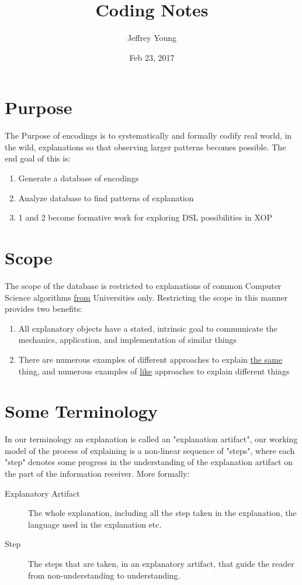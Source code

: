 \documentclass[10pt, letterpaper]{article}
\author{Jeffrey Young}
\date{Feb 23, 2017}
\title{Coding Notes}
\begin{document}
\maketitle

\section*{Purpose}
\label{sec:org4c99545}
The Purpose of encodings is to systematically and formally codify real world, in the wild, explanations so that observing larger patterns becomes possible. The end goal of this is:
\begin{enumerate}
\item Generate a database of encodings
\item Analyze database to find patterns of explanation
\item 1 and 2 become formative work for exploring DSL possibilities in XOP
\end{enumerate}
\section*{Scope}
\label{sec:orgd9f9156}
The scope of the database is restricted to explanations of common Computer Science algorithms \uline{from} Universities only. Restricting the scope in this manner provides two benefits:
\begin{enumerate}
\item All explanatory objects have a stated, intrinsic goal to communicate the mechanics, application, and implementation of similar things
\item There are numerous examples of different approaches to explain \uline{the same} thing, and numerous examples of \uline{like} approaches to explain different things
\end{enumerate}

\section*{Some Terminology}
\label{sec:org8a62c5b}
In our terminology an explanation is called an "explanation artifact", our
  working model of the process of explaining is a non-linear sequence of
  "steps", where each "step" denotes some progress in the understanding of the
  explanation artifact on the part of the information receiver. More formally:
\begin{description}
\item[{Explanatory Artifact}] The whole explanation, including all the step taken in the explanation, the language used in the explanation etc.
\item[{Step}] The steps that are taken, in an explanatory artifact, that guide the
reader from non-understanding to understanding.
\end{description}
\end{document}

